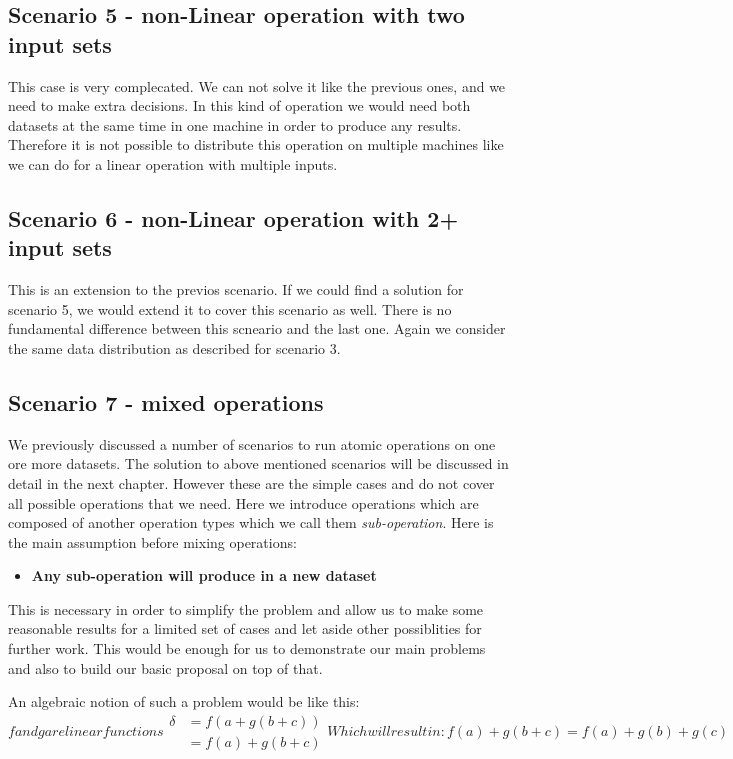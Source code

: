 \subsection{Scenario 5 - non-Linear operation with two input sets}
This case is very complecated. We can not solve it like the previous ones, and we need to make extra decisions.
In this kind of operation we would need both datasets at the same time in one machine in order to produce any
results. Therefore it is not possible to distribute this operation on multiple machines like we can do for 
a linear operation with multiple inputs. 

\subsection{Scenario 6 - non-Linear operation with 2+ input sets}
This is an extension to the previos scenario. 
If we could find a solution for scenario 5, we would extend it to cover this scenario as well. 
There is no fundamental difference between this scneario and the last one. Again we consider the same
data distribution as described for scenario 3.

\subsection{Scenario 7 - mixed operations}
We previously discussed a number of scenarios to run atomic operations on one ore more datasets. The solution to 
above mentioned scenarios will be discussed in detail in the next chapter. However these are the simple cases and
do not cover all possible operations that we need. Here we introduce operations which are composed of another
operation types which we call them \textit{sub-operation}.
Here is the main assumption before mixing operations:

\begin{itemize}
\item \textbf{Any sub-operation will produce in a new dataset}
\end{itemize}

This is necessary in order to simplify the problem and allow us to make some reasonable results
for a limited set of cases and let aside other possiblities for further work. This would be enough
for us to demonstrate our main problems and also to build our basic proposal on top of that.

An algebraic notion of such a problem would be like this:
\begin{subequations}

\textit{f} and \textit{g} are linear functions
\begin{align*}
\delta &= f(a + g(b + c))\\
&= f(a) + g(b + c)
\end{align*}

Which will result in:
\begin{equation}
f(a) + g(b + c) = f(a) + g(b) + g(c)
\end{equation}
\end{subequations}


